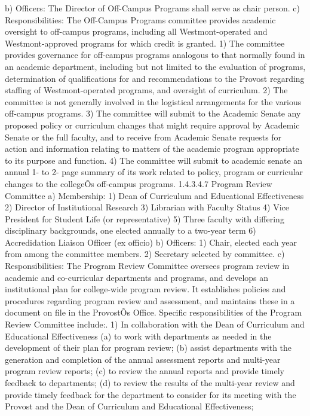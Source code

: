 \documentclass[letterpaper, 11pt]{article}
\begin{document}
b) Officers:
   The Director of Off-Campus Programs shall serve as chair person.
c) Responsibilities: The Off-Campus Programs committee provides academic oversight to off-campus programs, including all Westmont-operated and Westmont-approved programs for which credit is granted.
1) The committee provides governance for off-campus programs analogous to that normally found in an academic department, including but not limited to the evaluation of programs, determination of qualifications for and recommendations to the Provost regarding staffing of Westmont-operated programs, and oversight of curriculum.
2) The committee is not generally involved in the logistical arrangements for the various off-campus programs.
3) The committee will submit to the Academic Senate any proposed policy or curriculum changes that might require approval by Academic Senate or the full faculty, and to receive from Academic Senate requests for action and information relating to matters of the academic program appropriate to its purpose and function.
4) The committee will submit to academic senate an annual 1- to 2- page summary of its work related to policy, program or curricular changes to the collegeÕs off-campus programs. 
1.4.3.4.7 Program Review Committee 
a) Membership:
1) Dean of Curriculum and Educational Effectiveness
2) Director of Institutional Research
3) Librarian with Faculty Status
4) Vice President for Student Life (or representative) 
5) Three faculty with differing disciplinary backgrounds, one elected annually to a two-year term
6) Accredidation Liaison Officer (ex officio)
b) Officers:
1) Chair, elected each year from among the committee members.
2) Secretary selected by committee.
c) Responsibilities:
The Program Review Committee oversees program review in academic and co-curricular departments and programs, and develops an institutional plan for college-wide program review.  It establishes policies and procedures regarding program review and assessment, and maintains these in a document on file in the ProvostÕs Office.  Specific responsibilities of the Program Review Committee include:.
1) In collaboration with the Dean of Curriculum and Educational Effectiveness
(a) to work with departments as needed in the development of their plan for program review;
(b) assist departments with the generation and completion of the annual assessment reports and multi-year program review reports;
(c) to review the annual reports and provide timely feedback to departments;
(d) to review the results of the multi-year review and provide timely feedback for the department to consider for its meeting with the Provost and the Dean of Curriculum and Educational Effectiveness;
\end{document}
